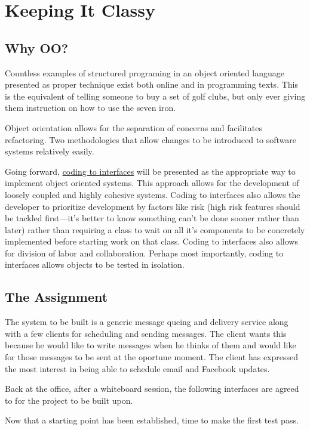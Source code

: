 
\chapter{Keeping It Classy}

\section{Why OO?}
Countless examples of structured programing in an object oriented language presented as proper technique exist both online and in programming texts. This is the equivalent of telling someone to buy a set of golf clubs, but only ever giving them instruction on how to use the seven iron.

Object orientation allows for the separation of concerns and facilitates refactoring. Two methodologies that allow changes to be introduced to software systems relatively easily.

Going forward, \href{http://www.javaworld.com/javaworld/jw-08-1999/jw-08-interfaces.html}{coding to interfaces} will be presented as the appropriate way to implement object oriented systems. This approach allows for the development of loosely coupled and highly cohesive systems. Coding to interfaces also allows the developer to prioritize development by factors like risk (high risk features should be tackled first---it's better to know something can't be done sooner rather than later) rather than requiring a class to wait on all it's components to be concretely implemented before starting work on that class. Coding to interfaces also allows for division of labor and collaboration. Perhaps most importantly, coding to interfaces allows objects to be tested in isolation.

\section{The Assignment}
The system to be built is a generic message queing and delivery service along with a few clients for scheduling and sending messages. The client wants this because he would like to write messages when he thinks of them and would like for those messages to be sent at the oportune moment. The client has expressed the most interest in being able to schedule email and Facebook updates.

Back at the office, after a whiteboard session, the following interfaces are agreed to for the project to be built upon.



Now that a starting point has been established, time to make the first test pass.